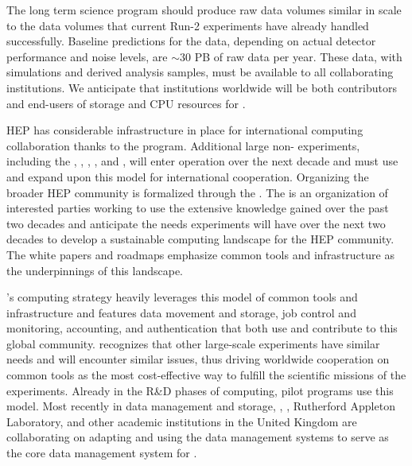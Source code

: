 The long term  science program should produce raw data volumes similar in scale to the data volumes that current  Run-2 experiments have already handled successfully.  Baseline predictions for the  data, depending on actual detector performance and noise levels, are $\sim 30$ PB of raw data per year.  These data, with simulations and derived analysis samples, must be available to all collaborating institutions.  We anticipate that institutions worldwide will be both contributors and end-users of storage and CPU resources for .



HEP has considerable infrastructure in place for international computing collaboration thanks to the  program.  Additional large non- experiments, including the , , , , and ,  will enter operation over the next decade and must use and expand upon this model for international cooperation.  Organizing the broader HEP community is formalized through the  \cite{Alves:2017she}.  The  is an organization of interested parties working to use the extensive knowledge gained over the past two decades and anticipate the needs experiments will have over the next two decades to develop a sustainable computing landscape for the HEP community.  The  white papers and roadmaps emphasize common tools and infrastructure as the underpinnings of this landscape.

's computing strategy heavily leverages this model of common tools and infrastructure and features data movement and storage, job control and monitoring, accounting, and authentication that both use and contribute to this global community.    recognizes that other large-scale experiments have similar needs and will encounter similar issues, thus driving worldwide cooperation on common tools as the most cost-effective way to fulfill the scientific missions of the experiments.  Already in the R\&D phases of  computing,  pilot programs use this model.  Most recently in data management and storage, , , Rutherford Appleton Laboratory, and other academic institutions in the United Kingdom are collaborating on adapting and using the  data management systems \cite{Barisits:2019fyl}  to serve as the core data management system for .

